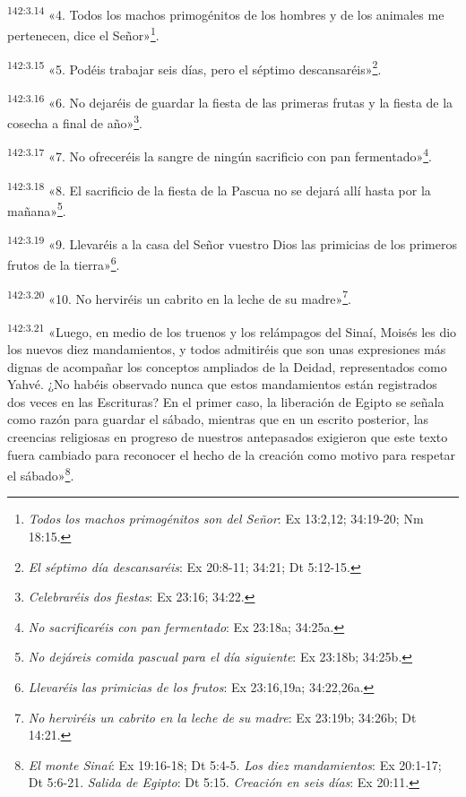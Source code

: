 \par 
\textsuperscript{142:3.14} «4. Todos los machos primogénitos de los hombres y de los animales me pertenecen, dice el Señor»\footnote{\textit{Todos los machos primogénitos son del Señor}: Ex 13:2,12; 34:19-20; Nm 18:15.}.

\par 
\textsuperscript{142:3.15} «5. Podéis trabajar seis días, pero el séptimo descansaréis»\footnote{\textit{El séptimo día descansaréis}: Ex 20:8-11; 34:21; Dt 5:12-15.}.

\par 
\textsuperscript{142:3.16} «6. No dejaréis de guardar la fiesta de las primeras frutas y la fiesta de la cosecha a final de año»\footnote{\textit{Celebraréis dos fiestas}: Ex 23:16; 34:22.}.

\par 
\textsuperscript{142:3.17} «7. No ofreceréis la sangre de ningún sacrificio con pan fermentado»\footnote{\textit{No sacrificaréis con pan fermentado}: Ex 23:18a; 34:25a.}.

\par 
\textsuperscript{142:3.18} «8. El sacrificio de la fiesta de la Pascua no se dejará allí hasta por la mañana»\footnote{\textit{No dejáreis comida pascual para el día siguiente}: Ex 23:18b; 34:25b.}.

\par 
\textsuperscript{142:3.19} «9. Llevaréis a la casa del Señor vuestro Dios las primicias de los primeros frutos de la tierra»\footnote{\textit{Llevaréis las primicias de los frutos}: Ex 23:16,19a; 34:22,26a.}.

\par 
\textsuperscript{142:3.20} «10. No herviréis un cabrito en la leche de su madre»\footnote{\textit{No herviréis un cabrito en la leche de su madre}: Ex 23:19b; 34:26b; Dt 14:21.}.

\par 
\textsuperscript{142:3.21} «Luego, en medio de los truenos y los relámpagos del Sinaí, Moisés les dio los nuevos diez mandamientos, y todos admitiréis que son unas expresiones más dignas de acompañar los conceptos ampliados de la Deidad, representados como Yahvé. ¿No habéis observado nunca que estos mandamientos están registrados dos veces en las Escrituras? En el primer caso, la liberación de Egipto se señala como razón para guardar el sábado, mientras que en un escrito posterior, las creencias religiosas en progreso de nuestros antepasados exigieron que este texto fuera cambiado para reconocer el hecho de la creación como motivo para respetar el sábado»\footnote{\textit{El monte Sinaí}: Ex 19:16-18; Dt 5:4-5. \textit{Los diez mandamientos}: Ex 20:1-17; Dt 5:6-21. \textit{Salida de Egipto}: Dt 5:15. \textit{Creación en seis días}: Ex 20:11.}.

